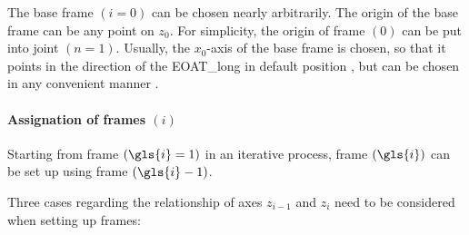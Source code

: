 The base frame $(i=0)$ can be chosen nearly arbitrarily. The origin of the base frame can be any point on $z_0$. For simplicity, the origin of frame $(0)$ can be put into joint $(n=1)$.  Usually, the $x_0$-axis of the base frame is chosen, so that it points in the direction of the \gls{EOAT_long} in default position \cite{DenavitHartenbergKonventionen}, but can be chosen in any convenient manner \cite{SpongDynContr}.

\paragraph{Assignation of frames $(i)$}

Starting from frame $(\gls{i}=1)$ in an iterative process, frame $(\gls{i})$ can be set up using frame $(\gls{i}-1)$.

Three cases regarding the relationship of axes $z_{i-1}$ and $z_i$  need to be considered when setting up frames:
